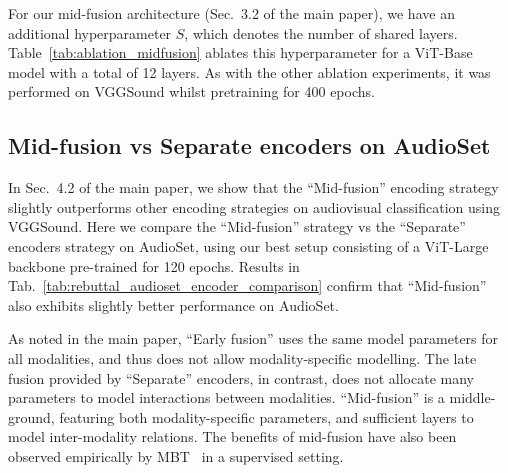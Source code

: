 \documentclass[10pt,twocolumn,letterpaper]{article}
\begin{document}
 
For our mid-fusion architecture (Sec.~3.2 of the main paper), we have an additional hyperparameter $S$, which denotes the number of shared layers.
Table~\ref{tab:ablation_midfusion} ablates this hyperparameter for a ViT-Base model with a total of 12 layers.
As with the other ablation experiments, it was performed on VGGSound whilst pretraining for 400 epochs.




\subsection{Mid-fusion vs Separate encoders on AudioSet}
In Sec.~4.2 of the main paper, we show that the ``Mid-fusion'' encoding strategy slightly outperforms other encoding strategies on audiovisual classification using VGGSound.
Here we compare the ``Mid-fusion'' strategy vs the ``Separate'' encoders strategy on AudioSet, using our best setup consisting of a ViT-Large backbone pre-trained for 120 epochs.
Results in Tab.~\ref{tab:rebuttal_audioset_encoder_comparison} confirm that ``Mid-fusion'' also exhibits slightly better performance on AudioSet.

As noted in the main paper, ``Early fusion'' uses the same model parameters for all modalities, and thus does not allow modality-specific modelling.
The late fusion provided by ``Separate'' encoders, in contrast, does not allocate many parameters to model interactions between modalities.
``Mid-fusion'' is a middle-ground, featuring both modality-specific parameters, and sufficient layers to model inter-modality relations.
The benefits of mid-fusion have also been observed empirically by MBT~\cite{nagrani2021attention} in a supervised setting.
\begin{table}[t]
	\caption{Encoder architecture comparison on AudioSet. Large backbone pretrained for 120 epochs, using a ``Shared'' decoder.} 
	\vspace{-0.7\baselineskip}
	\centering
	\label{tab:rebuttal_audioset_encoder_comparison}
\end{table} 
\end{document}
